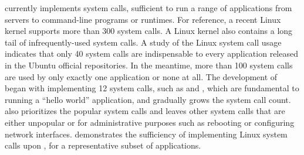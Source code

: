 







\Thelibos{} currently implements \graphenesyscallnum{} system calls,
sufficient to run a range of applications from servers to command-line programs or runtimes.
For reference, a recent Linux kernel supports more than 300 system calls.
A Linux kernel also
contains a long tail of infrequently-used system calls.
A study of the Linux system call usage~\cite{tsai16apistudy}
indicates that only 40 system calls are indispensable to every application released in the Ubuntu official repositories.
In the meantime, more than 100 system calls are used by only exactly one application
or none at all.
The development of \thelibos{} began with
implementing 12 system calls, such as  and , which are fundamental to running a ``hello world'' application,
and gradually grows the system call count.
\graphene{} also prioritizes the popular system calls and leaves other system calls that are either unpopular or for administrative purposes such as rebooting
or configuring network interfaces.
\thelibos{} demonstrates the sufficiency of
implementing Linux system calls upon \thehostabi{},
for a representative subset of applications.


